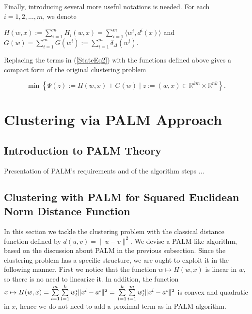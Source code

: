 \documentclass[11pt]{article}
\numberwithin{equation}{section}
\begin{document}
Finally, introducing several more useful notations is needed. For each $i=1, 2, \ldots , m$, we denote
\begin{center}
$H(w,x) := \sum\limits_{i=1}^{m} H_i(w,x) = \sum\limits_{i=1}^{m} \langle w^i , d^i(x) \rangle$ and $G(w) = \sum\limits_{i=1}^{m} G(w^i) := \sum\limits_{i=1}^{m} \delta_{\Delta}(w^i) .$
\end{center}

Replacing the terms in (\ref{StateEq2}) with the functions defined above gives a compact form of the original clustering problem

\begin{equation}
	\min \left\lbrace \Psi(z) := H(w,x) + G(w) \mid z := (w,x) \in \mathbb{R}^{km} \times \mathbb{R}^{nk} \right\rbrace . \label{StateEq4}
\end{equation}


\section{Clustering via PALM Approach}

\subsection{Introduction to PALM Theory}

Presentation of PALM's requirements and of the algorithm steps  $\ldots$


\subsection{Clustering with PALM for Squared Euclidean Norm Distance Function}

In this section we tackle the clustering problem with the classical distance function defined by $d(u,v) = \|u-v\|^2$. We devise a PALM-like algorithm, based on the discussion about PALM in the previous subsection.
Since the clustering problem has a specific structure, we are ought to exploit it in the following manner.
First we notice that the function 
$w \mapsto H(w,x)$ is linear in $w$, so there is no need to linearize it. In addition, the function 
$x \mapsto H(w,x) = 
\sum\limits_{i=1}^{m} \sum\limits_{l=1}^{k} w^i_l \|x^l - a^i\|^2 =
\\ \sum\limits_{l=1}^{k} \sum\limits_{i=1}^{m} w^i_l \|x^l - a^i\|^2$ is convex and quadratic in $x$, hence we do not need to add a proximal term as in PALM algorithm.
\end{document}

